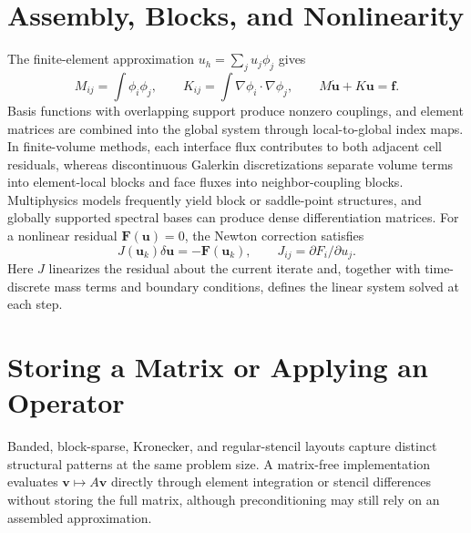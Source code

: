 \section{Assembly, Blocks, and Nonlinearity}
The finite-element approximation $u_h=\sum_j u_j\phi_j$ gives
\[
 M_{ij}=\int\phi_i\phi_j,\qquad
 K_{ij}=\int\nabla\phi_i\cdot\nabla\phi_j,\qquad
 M\dot{\bm u}+K\bm u=\bm f.
\]
Basis functions with overlapping support produce nonzero couplings, and element matrices are combined into the global system through local-to-global index maps. In finite-volume methods, each interface flux contributes to both adjacent cell residuals, whereas discontinuous Galerkin discretizations separate volume terms into element-local blocks and face fluxes into neighbor-coupling blocks. Multiphysics models frequently yield block or saddle-point structures, and globally supported spectral bases can produce dense differentiation matrices.
For a nonlinear residual $\bm F(\bm u)=0$, the Newton correction satisfies
\[
 J(\bm u_k)\delta\bm u=-\bm F(\bm u_k),\qquad J_{ij}=\partial F_i/\partial u_j.
\]
Here $J$ linearizes the residual about the current iterate and, together with time-discrete mass terms and boundary conditions, defines the linear system solved at each step.
\section{Storing a Matrix or Applying an Operator}
Banded, block-sparse, Kronecker, and regular-stencil layouts capture distinct structural patterns at the same problem size. A matrix-free implementation evaluates $\bm v\mapsto A\bm v$ directly through element integration or stencil differences without storing the full matrix, although preconditioning may still rely on an assembled approximation.
